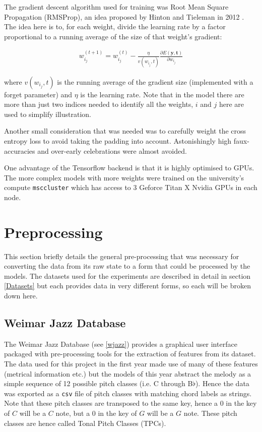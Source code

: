 \documentclass[bsc,singlespacing,logo, parskip, deptreport]{infthesis}
\begin{document}
The gradient descent algorithm used for training was Root Mean Square Propagation (RMSProp), an idea proposed by Hinton and Tieleman in 2012 \cite{tieleman2012lecture}. The idea here is to, for each weight, divide the learning rate by a factor proportional to a running average of the size of that weight's gradient:

\begin{align}
  w_{i_j}^{(t+1)} = w_{i_j}^{(t)} - \frac{\eta}{v(w_{i_j}, t)} \frac{\partial E(\bm{y}, \bm{t})}{\partial w_{i_j}}
\end{align}

where $v(w_{i_j}, t)$ is the running average of the gradient size (implemented with a forget parameter) and $\eta$ is the learning rate. Note that in the model there are more than just two indices needed to identify all the weights, $i$ and $j$ here are used to simplify illustration.

Another small consideration that was needed was to carefully weight the cross entropy loss to avoid taking the padding into account. Astonishingly high faux-accuracies and over-early celebrations were almost avoided.

One advantage of the Tensorflow backend is that it is highly optimised to GPUs. The more complex models with more weights were trained on the university's compute {\tt msccluster} which has access to 3 Geforce Titan X Nvidia GPUs in each node.

\section{Preprocessing} \label{preprocessing}

This section briefly details the general pre-processing that was necessary for converting the data from its raw state to a form that could be processed by the models. The datasets used for the experiments are described in detail in section \ref{Datasets} but each provides data in very different forms, so each will be broken down here.

\subsection{Weimar Jazz Database}

The Weimar Jazz Database (see \ref{wjazz}) provides a graphical user interface packaged with pre-processing tools for the extraction of features from its dataset. The data used for this project in the first year made use of many of these features (metrical information etc.) but the models of this year abstract the melody as a simple sequence of 12 possible pitch classes (i.e. C through B$\flat$). Hence the data was exported as a {\tt csv} file of pitch classes with matching chord labels as strings. Note that these pitch classes are transposed to the same key, hence a 0 in the key of $C$ will be a $C$ note, but a 0 in the key of $G$ will be a $G$ note. These pitch classes are hence called Tonal Pitch Classes (TPCs).
\end{document}

